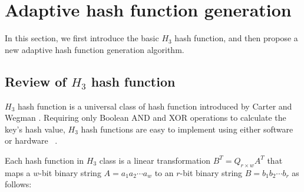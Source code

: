 \documentclass[10pt,journal,compsoc]{IEEEtran}
\begin{document}
%
%



\section{Adaptive hash function generation}
\label{sec:Adaptive Hash function Generation}
In this section,
we first  introduce the basic $H_3$ hash function, and then propose a new adaptive hash function generation algorithm.


\subsection{Review of $H_3$ hash function}
\label{subsec:The review of $H_3$ hash function}
$H_3$ hash function is a universal class of hash function introduced by Carter and Wegman \cite{carter1979universal}.
 Requiring only Boolean AND and XOR operations to calculate the key's hash value, $H_3$ hash functions are easy to implement using either software or hardware ~\cite{ramakrishna1997efficient,ramakrishna1991perfect}.

Each hash function in $H_3$ class is a linear transformation ${B^T} = {Q_{r \times w}}{A^T}$ that maps a $w$-bit binary string $A = {a_1}{a_2} \cdots {a_w}$ to an $r$-bit binary string $B = {b_1}{b_2} \cdots {b_r}$ as follows:
\end{document}

